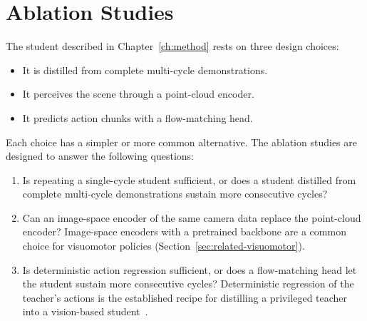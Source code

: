 \section{Ablation Studies}\label{sec:ablations}

The student described in Chapter~\ref{ch:method} rests on three design choices:
\begin{itemize}
  \item It is distilled from complete multi-cycle demonstrations.
  \item It perceives the scene through a point-cloud encoder.
  \item It predicts action chunks with a flow-matching head.
\end{itemize}
Each choice has a simpler or more common alternative. The ablation studies are designed to answer the following questions:
\begin{enumerate}
  \item[(i)] Is repeating a single-cycle student sufficient, or does a student distilled from complete multi-cycle demonstrations sustain more consecutive cycles?
  \item[(ii)] Can an image-space encoder of the same camera data replace the point-cloud encoder? Image-space encoders with a pretrained backbone are a common choice for visuomotor policies (Section~\ref{sec:related-visuomotor}).
  \item[(iii)] Is deterministic action regression sufficient, or does a flow-matching head let the student sustain more consecutive cycles? Deterministic regression of the teacher's actions is the established recipe for distilling a privileged teacher into a vision-based student~\cite{Singh2025}.
\end{enumerate}

